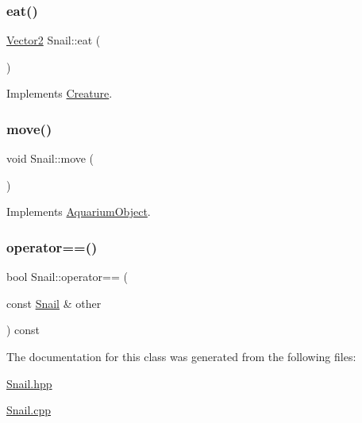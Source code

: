 \subsubsection{\texorpdfstring{eat()}{eat()}}
{\footnotesize\ttfamily \mbox{\hyperlink{struct_vector2}{Vector2}} Snail\+::eat (\begin{DoxyParamCaption}{ }\end{DoxyParamCaption})\hspace{0.3cm}{\ttfamily [virtual]}}



Implements \mbox{\hyperlink{class_creature_a0d531a4c04c1021833ddb0e48864dbf4}{Creature}}.

\mbox{\label{class_snail_af5892ec122d9199480c813b74488256b}} 
\subsubsection{\texorpdfstring{move()}{move()}}
{\footnotesize\ttfamily void Snail\+::move (\begin{DoxyParamCaption}{ }\end{DoxyParamCaption})\hspace{0.3cm}{\ttfamily [virtual]}}



Implements \mbox{\hyperlink{class_aquarium_object_a42c4de640f89ac8aebc26b7618578575}{Aquarium\+Object}}.

\mbox{\label{class_snail_ab01308256de08e789ca752e1608120f7}} 
\subsubsection{\texorpdfstring{operator==()}{operator==()}}
{\footnotesize\ttfamily bool Snail\+::operator== (\begin{DoxyParamCaption}\item[{const \mbox{\hyperlink{class_snail}{Snail}} \&}]{other }\end{DoxyParamCaption}) const}



The documentation for this class was generated from the following files\+:\begin{DoxyCompactItemize}
\item 
\mbox{\hyperlink{_snail_8hpp}{Snail.\+hpp}}\item 
\mbox{\hyperlink{_snail_8cpp}{Snail.\+cpp}}\end{DoxyCompactItemize}
